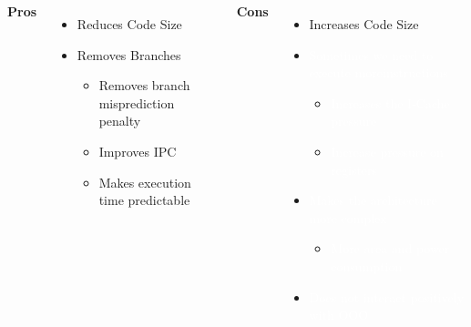    \begin{columns}[t] %
            \textbf{Pros}
            \begin{itemize}
                \item Reduces Code Size
                \item Removes Branches
                \begin{itemize}
                    \item Removes branch misprediction penalty
                    \item Improves IPC
                    \item Makes execution time predictable
                \end{itemize}
            \end{itemize}

            \textbf{Cons}
            \begin{itemize}
                \item Increases Code Size
                \item \textcolor{white}{Sometimes we need to execute moreinstructions}
                \begin{itemize}
                    \item \textcolor{white}{Increases the I-Cache pressure}
                    \item \textcolor{white}{Increase pressure on registers}
                \end{itemize}
                \item \textcolor{white}{Makes the architecture more complex}
                \begin{itemize}
                    \item \textcolor{white}{More area and power consumption}
                \end{itemize}
                \item \textcolor{white}{Does not interact positively with OOO}
                
                
            \end{itemize}
    \end{columns}
    
